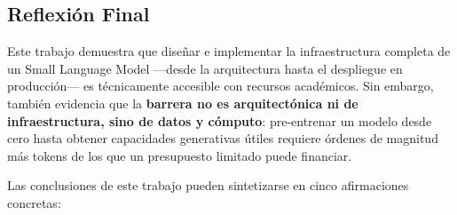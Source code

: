 \subsection{Reflexión Final}

Este trabajo demuestra que diseñar e implementar la infraestructura completa de un Small Language Model ---desde la arquitectura hasta el despliegue en producción--- es técnicamente accesible con recursos académicos. Sin embargo, también evidencia que la \textbf{barrera no es arquitectónica ni de infraestructura, sino de datos y cómputo}: pre-entrenar un modelo desde cero hasta obtener capacidades generativas útiles requiere órdenes de magnitud más tokens de los que un presupuesto limitado puede financiar.

Las conclusiones de este trabajo pueden sintetizarse en cinco afirmaciones concretas:

